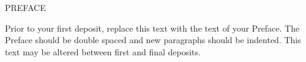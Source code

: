 \begin{doublespace}
\begin{tightcenter}
PREFACE
\mylinespacing
\end{tightcenter}

Prior to your first deposit, replace this text with the text of your Preface. The Preface should be double spaced and new paragraphs should be indented. This text may be altered between first and final deposits.

\mylinespacing
\mylinespacing
\begin{tightcenter}
\myoptpg
\end{tightcenter}
\end{doublespace}
